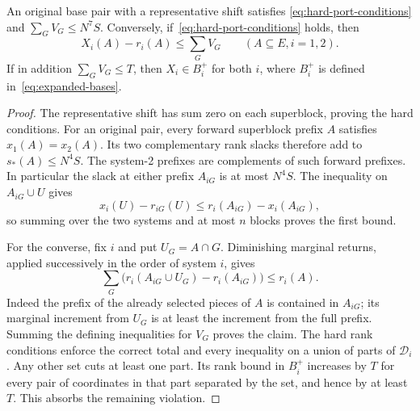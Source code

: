 \begin{lemma}\label{lem:port-penalties}
An original base pair with a representative shift satisfies
\eqref{eq:hard-port-conditions} and $\sum_GV_G\le N^7S$.
Conversely, if~\eqref{eq:hard-port-conditions} holds, then
\[
 X_i(A)-r_i(A)\le\sum_G V_G\qquad(A\subseteq E, i=1,2).
\]
If in addition $\sum_GV_G\le T$, then $X_i\in B_i^+$ for both $i$,
where $B_i^+$ is defined in~\eqref{eq:expanded-bases}.
\end{lemma}

\begin{proof}
The representative shift has sum zero on each superblock, proving the
hard conditions. For an original pair, every forward superblock prefix $A$
satisfies $x_1(A)=x_2(A)$. Its two complementary rank slacks therefore
add to $s_*(A)\le N^4S$. The system-2 prefixes are complements of such
forward prefixes. In particular the slack at either prefix
$A_{iG}$ is at most $N^4S$. The inequality on $A_{iG}\cup U$ gives
\[
 x_i(U)-r_{iG}(U)\le r_i(A_{iG})-x_i(A_{iG}),
\]
so summing over the two systems and at most $n$ blocks proves the first
bound.

For the converse, fix $i$ and put $U_G=A\cap G$. Diminishing marginal
returns, applied successively in the order of system $i$, gives
\[
 \sum_G\bigl(r_i(A_{iG}\cup U_G)-r_i(A_{iG})\bigr)\le r_i(A).
\]
Indeed the prefix of the already selected pieces of $A$ is contained
in $A_{iG}$; its marginal increment from $U_G$ is at least the increment
from the full prefix. Summing the defining inequalities for $V_G$
proves the claim. The hard rank conditions enforce the correct total
and every inequality on a union of parts of $\mathcal D_i$. Any other
set cuts at least one part. Its rank bound in $B_i^+$ increases by
$T$ for every pair of coordinates in that part separated by the set,
and hence by at least $T$. This absorbs the remaining violation.
\end{proof}

